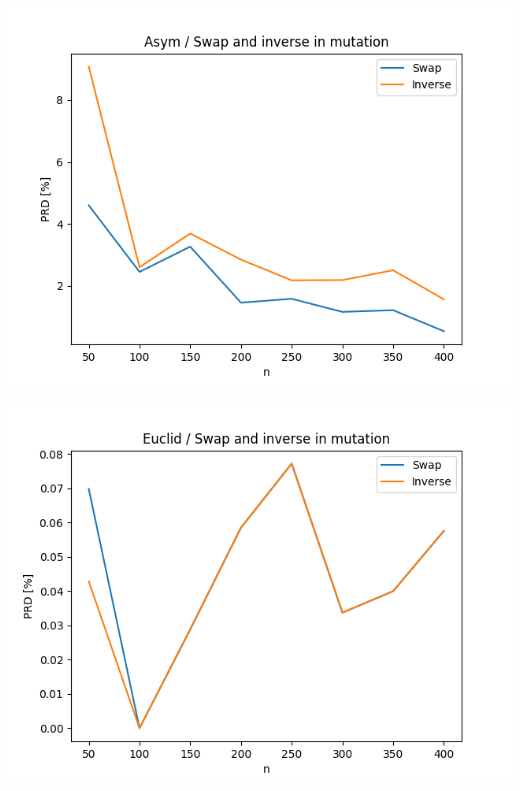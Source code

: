 \documentclass{article}
\begin{document}
\begin{center}
\includegraphics[width=\textwidth, 
                   height = 0.4\textheight, 
                   keepaspectratio]
                  {plots/asym_6_swap_inverse} 
\end{center}

\begin{center}
\includegraphics[width=\textwidth, 
                   height = 0.4\textheight, 
                   keepaspectratio]
                  {plots/euclid_6_swap_inverse} 
\end{center}
\end{document}

